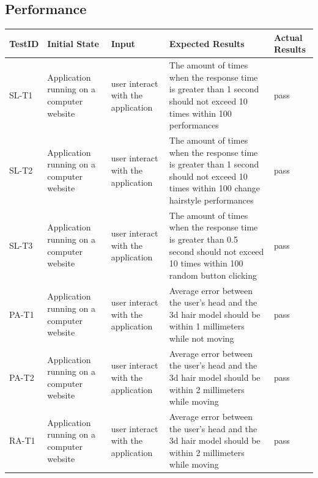 \documentclass[12pt, titlepage]{article}
\begin{document}
\subsection{Performance}
\begin{tabular}{ |p{2cm}| p{3cm} |p{4cm}| p{4cm}|p{2cm}|  }
\hline
 TestID & Initial State & Input & Expected Results & Actual Results\\ 
\hline
 SL-T1 & Application running on a computer website & user interact with the application & The amount of times when the response time is greater than 1 second should not exceed 10 times within 100 performances  & pass\\
  \hline
 SL-T2 & Application running on a computer website & user interact with the application & The amount of times when the response time is greater than 1 second should not exceed 10 times within 100 change hairstyle performances  & pass\\
 \hline
 SL-T3 & Application running on a computer website & user interact with the application & The amount of times when the response time is greater than 0.5 second should not exceed 10 times within 100 random button clicking  & pass\\
  \hline
 PA-T1 & Application running on a computer website & user interact with the application & Average error between the user's head and the 3d hair model should be within 1 millimeters while not moving  & pass\\
 \hline
 PA-T2 & Application running on a computer website & user interact with the application & Average error between the user's head and the 3d hair model should be within 2 millimeters while moving  & pass\\
 \hline
 RA-T1 & Application running on a computer website & user interact with the application & Average error between the user's head and the 3d hair model should be within 2 millimeters while moving  & pass\\
 \hline
 \end{tabular}
\end{document}
